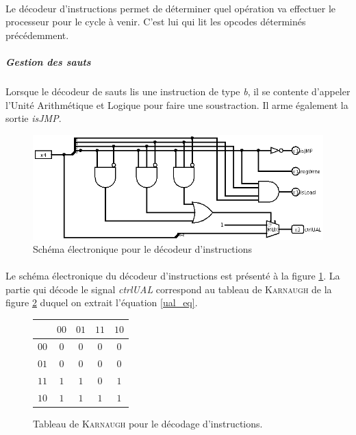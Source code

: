 \paragraph{}{
	Le décodeur d'instructions permet de déterminer quel opération va effectuer
	le processeur pour le cycle à venir. C'est lui qui lit les opcodes déterminés
	précédemment.
}
	\subparagraph{Gestion des sauts}{
		Lorsque le décodeur de sauts lis une instruction de type \textit{b},
		il se contente d'appeler l'Unité Arithmétique et Logique pour faire
		une soustraction. Il arme également la sortie \textit{isJMP}.
	}

\begin{figure}
	\centering
	\includegraphics[scale=0.4,origin=c]{circuits/deco_instru.png}
	\caption{
		\label{decod_inst_circ}
		Sch\'{e}ma \'{e}lectronique pour le d\'{e}codeur d'instructions
		}
\end{figure}

\paragraph{}{
	Le schéma électronique du décodeur d'instructions est présenté à la figure
	\ref{decod_inst_circ}. La partie qui décode le signal \textit{ctrlUAL} 
	correspond au tableau de \textsc{Karnaugh} de la figure 
	\ref{decod_ctrlual_karnaugh} duquel on extrait l'équation \ref{ual_eq}.
}


\begin{figure}
	\begin{center}
	\centering
	\begin{tabular}{|c|c|c|c|c|}
		\hline
		\backslashbox{$b_{3}b_{2}$}{$b_{1}b_{0}$} & $00$ & $01$ & $11$ & $10$ \\ 
		\hline 
		$00$ & $0$ & $0$ & $0$ & $0$ \\ 
		\hline 
		$01$ & $0$ & $0$ & $0$ & $0$ \\ 
		\hline 
		$11$ & $1$ & $1$ & $0$ & $1$ \\ 
		\hline 
		$10$ & $1$ & $1$ & $1$ & $1$ \\ 
		\hline 
	\end{tabular} 
	\end{center}
	\caption{
		\label{decod_ctrlual_karnaugh}
		Tableau de \textsc{Karnaugh} pour le décodage d'instructions.
	}
\end{figure}

